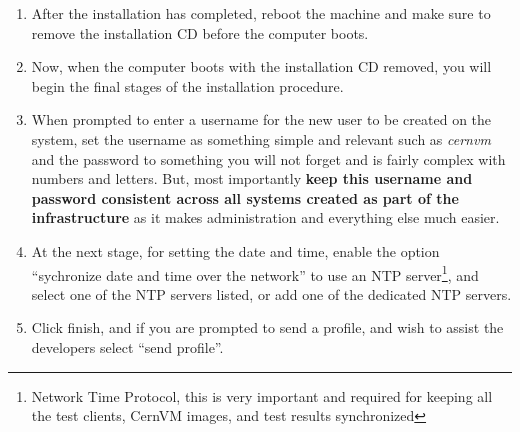 \begin{enumerate}
\item	After the installation has completed, reboot the machine and make sure to remove the installation CD before the computer boots.

\item	Now, when the computer boots with the installation CD removed, you will begin the final stages of the installation procedure.
		
\item	When prompted to enter a username for the new user to be created on the system, set the username as something simple and relevant
		such as \emph{cernvm} and the password to something you will not forget and is fairly complex with numbers and letters. But, most 
		importantly {\bf keep this username and password consistent across all systems created as part of the infrastructure} as it makes 
		administration and everything else much easier.
		
\item	At the next stage, for setting the date and time, enable the option ``sychronize date and time over the network'' to use an NTP
		server\footnote{Network Time Protocol, this is very important and required for keeping all the test clients, CernVM images,
		and test results synchronized}, and select one of the NTP servers listed, or add one of the \cern dedicated NTP servers.
		
\item	Click finish, and if you are prompted to send a profile, and wish to assist the developers select ``send profile''.
\end{enumerate}


